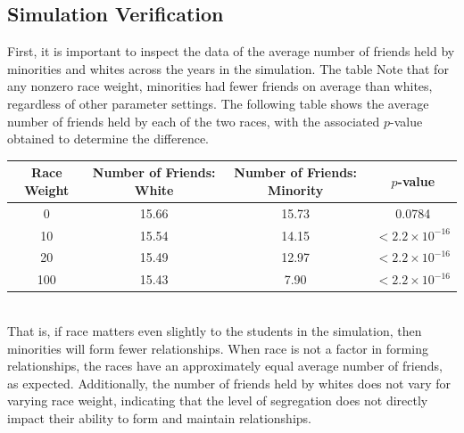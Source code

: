 \subsection{Simulation Verification}

First, it is important to inspect the data of the average number of friends held by minorities and whites across the years 
in the simulation. The table Note that for any nonzero race weight, 
minorities had fewer friends on average than whites, regardless of other parameter settings. The following table shows the average 
number of friends held by each of the two races, with the associated $p$-value obtained to determine the difference.\\

\begin{center}
\begin{tabular}{|c|c|c|c|}
\hline
Race Weight & Number of Friends: White & Number of Friends: Minority & $p$-value\\
\hline
0 & 15.66 & 15.73 & 0.0784\\
10 & 15.54 & 14.15 & $<2.2\times 10^{-16}$\\
20 & 15.49 & 12.97 & $<2.2\times 10^{-16}$\\
100 & 15.43 & 7.90 & $<2.2\times 10^{-16}$\\
\hline
\end{tabular}
\end{center}~~\\

That is, if race matters even slightly to the students in the simulation, then minorities will form fewer relationships. When race is not a factor in 
forming relationships, the races have an approximately equal average number of friends, as expected. Additionally, the number of friends held by whites 
does not vary for varying race weight, indicating that the level of segregation does not directly impact their ability to form and maintain relationships.



